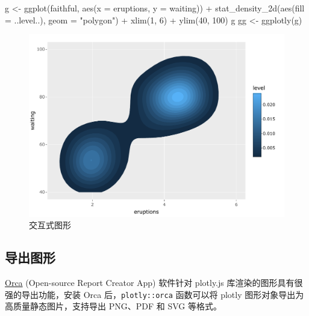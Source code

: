 \documentclass[
  b5paper,
  UTF8,twoside]{book}
\newenvironment{Shaded}{\begin{snugshade}}{\end{snugshade}}
\newcommand{\AttributeTok}[1]{\textcolor[rgb]{0.77,0.63,0.00}{#1}}
\newcommand{\DecValTok}[1]{\textcolor[rgb]{0.00,0.00,0.81}{#1}}
\newcommand{\FunctionTok}[1]{\textcolor[rgb]{0.00,0.00,0.00}{#1}}
\newcommand{\NormalTok}[1]{#1}
\newcommand{\OtherTok}[1]{\textcolor[rgb]{0.56,0.35,0.01}{#1}}
\newcommand{\SpecialCharTok}[1]{\textcolor[rgb]{0.00,0.00,0.00}{#1}}
\newcommand{\StringTok}[1]{\textcolor[rgb]{0.31,0.60,0.02}{#1}}
\begin{document}
\begin{Shaded}
\begin{Highlighting}[]
\NormalTok{g }\OtherTok{\textless{}{-}} \FunctionTok{ggplot}\NormalTok{(faithful, }\FunctionTok{aes}\NormalTok{(}\AttributeTok{x =}\NormalTok{ eruptions, }\AttributeTok{y =}\NormalTok{ waiting)) }\SpecialCharTok{+}
  \FunctionTok{stat\_density\_2d}\NormalTok{(}\FunctionTok{aes}\NormalTok{(}\AttributeTok{fill =}\NormalTok{ ..level..), }\AttributeTok{geom =} \StringTok{"polygon"}\NormalTok{) }\SpecialCharTok{+}
  \FunctionTok{xlim}\NormalTok{(}\DecValTok{1}\NormalTok{, }\DecValTok{6}\NormalTok{) }\SpecialCharTok{+} \FunctionTok{ylim}\NormalTok{(}\DecValTok{40}\NormalTok{, }\DecValTok{100}\NormalTok{)}
\NormalTok{g}
\NormalTok{gg }\OtherTok{\textless{}{-}} \FunctionTok{ggplotly}\NormalTok{(g)}
\end{Highlighting}
\end{Shaded}

\begin{figure}

{\centering \includegraphics{interactives/faithful} 

}

\caption{交互式图形}\label{fig:faithful}
\end{figure}

\hypertarget{subsec:plotly-output}{%
\subsection{导出图形}\label{subsec:plotly-output}}

\href{https://github.com/plotly/orca\#installation}{Orca} (Open-source Report Creator App) 软件针对 plotly.js 库渲染的图形具有很强的导出功能，安装 Orca 后，\texttt{plotly::orca} 函数可以将 plotly 图形对象导出为高质量静态图片，支持导出 PNG、PDF 和 SVG 等格式。
\end{document}
